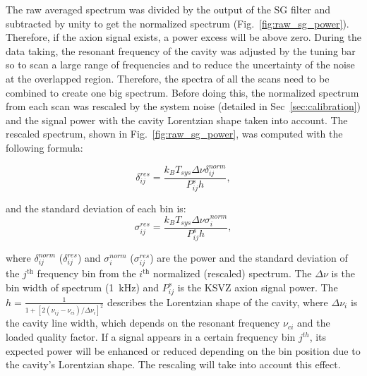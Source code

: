 The raw averaged spectrum was divided by the output of the SG filter and 
subtracted by unity to get the normalized spectrum (Fig.~\ref{fig:raw_sg_power}).
Therefore, if the axion signal exists, a power excess will be above zero.
During the data taking, the resonant frequency of the cavity was  
adjusted by the tuning bar so to scan a large range of frequencies and to 
reduce the uncertainty of the noise at the overlapped region. Therefore, the 
spectra of all the scans need to be combined to create one big spectrum. 
Before doing this, 
the normalized spectrum from each scan was rescaled by the system noise 
(detailed in Sec~\ref{sec:calibration}) and the signal power with the cavity 
Lorentzian shape taken into account. The rescaled spectrum, shown in 
Fig.~\ref{fig:raw_sg_power}, was computed with the following formula:

\begin{equation}
  \label{eq:respower_eqn}
  \delta_{ij}^{res} = \frac{k_{B}T_{sys}\Delta\nu \delta_{ij}^{norm}}{P_{ij}^{s} h},
\end{equation}

and the standard deviation of each bin is:
\begin{equation}
  \label{eq:ressigma_eqn}
  \sigma_{ij}^{res} = \frac{k_{B}T_{sys}\Delta\nu \sigma_{i}^{norm}}{P_{ij}^{s} h},
\end{equation}

where $\delta_{ij}^{norm}$ ($\delta_{ij}^{res}$) and $\sigma_{i}^{norm}$ ($\sigma_{ij}^{res}$)
are the power and the standard deviation of the $j^\text{th}$ frequency bin from the 
 $i^\text{th}$ normalized (rescaled) spectrum. The $\Delta\nu$ is the bin width of 
spectrum (1~kHz) and  $P_{ij}^{s}$ is the KSVZ axion signal power. The 
$h = \frac{1}{1 + [2(\nu_{ij} - \nu_{ci})/\Delta\nu_{i}]^2}$ 
describes the Lorentzian shape of the cavity, where 
$\Delta\nu_{i}$ is the cavity line width, which depends on the resonant 
frequency $\nu_{ci}$ and the loaded quality factor. 
%
If a signal appears in a certain frequency bin $j^{th}$, its expected power 
will be enhanced or reduced depending on the bin position due to the cavity's 
Lorentzian shape. The rescaling will take into account this effect.

